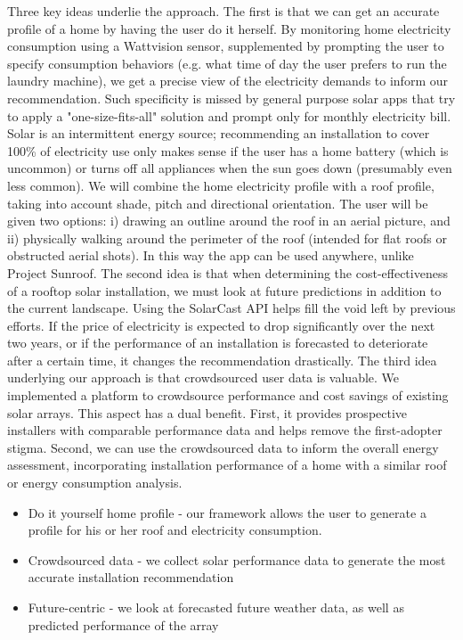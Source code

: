 \documentclass[pageno]{jpaper}
\begin{document}
Three key ideas underlie the approach. The first is that we can get an accurate profile of a home by having the user do it herself. By monitoring home electricity consumption using a Wattvision sensor, supplemented by prompting the user to specify consumption behaviors (e.g. what time of day the user prefers to run the laundry machine), we get a precise view of the electricity demands to inform our recommendation. Such specificity is missed by general purpose solar apps that try to apply a "one-size-fits-all" solution and prompt only for monthly electricity bill. Solar is an intermittent energy source; recommending an installation to cover 100\% of electricity use only makes sense if the user has a home battery (which is uncommon) or turns off all appliances when the sun goes down (presumably even less common). We will combine the home electricity profile with a roof profile, taking into account shade, pitch and directional orientation. The user will be given two options: i) drawing an outline around the roof in an aerial picture, and ii) physically walking around the perimeter of the roof (intended for flat roofs or obstructed aerial shots). In this way the app can be used anywhere, unlike Project Sunroof. \newline
\newline
\indent The second idea is that when determining the cost-effectiveness of a rooftop solar installation, we must look at future predictions in addition to the current landscape. Using the SolarCast API helps fill the void left by previous efforts. If the price of electricity is expected to drop significantly over the next two years, or if the performance of an installation is forecasted to deteriorate after a certain time, it changes the recommendation drastically. \newline
\newline
\indent The third idea underlying our approach is that crowdsourced user data is valuable. We implemented a platform to crowdsource performance and cost savings of existing solar arrays. This aspect has a dual benefit. First, it provides prospective installers with comparable performance data and helps remove the first-adopter stigma. Second, we can use the crowdsourced data to inform the overall energy assessment, incorporating installation performance of a home with a similar roof or energy consumption analysis.

\begin{itemize}
\item Do it yourself home profile
- our framework allows the user to generate a profile for his or her roof and electricity consumption.
\item Crowdsourced data
- we collect solar performance data to generate the most accurate installation recommendation
\item Future-centric
- we look at forecasted future weather data, as well as predicted performance of the array
\end{itemize}
\end{document}

